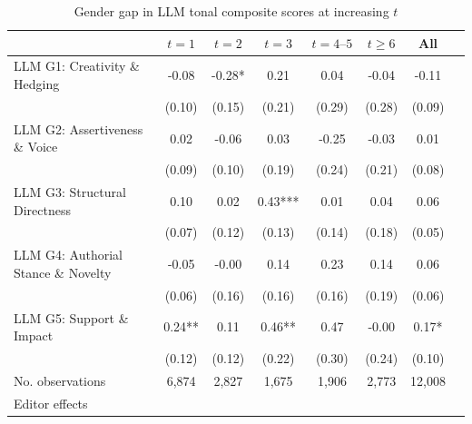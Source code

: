 \begin{table}
    \footnotesize
    \centering
    \begin{threeparttable}
        \caption{Gender gap in LLM tonal composite scores at increasing \(t\)}
        \label{tableH2llm_FemRatio}
        \begin{tabular}{p{3cm}S@{}S@{}S@{}S@{}S@{}S@{}S@{}}
            \toprule
            &{\(t=1\)}&{\(t=2\)}&{\(t=3\)}&{\(t=4\text{--}5\)}&{\(t\ge6\)}&{All}\\
            \midrule
            LLM G1: Creativity \& Hedging &       -0.08   &       -0.28*  &        0.21   &        0.04   &       -0.04   &       -0.11   \\
                                          &      (0.10)   &      (0.15)   &      (0.21)   &      (0.29)   &      (0.28)   &      (0.09)   \\
            LLM G2: Assertiveness \& Voice&        0.02   &       -0.06   &        0.03   &       -0.25   &       -0.03   &        0.01   \\
                                          &      (0.09)   &      (0.10)   &      (0.19)   &      (0.24)   &      (0.21)   &      (0.08)   \\
            LLM G3: Structural Directness &        0.10   &        0.02   &        0.43***&        0.01   &        0.04   &        0.06   \\
                                          &      (0.07)   &      (0.12)   &      (0.13)   &      (0.14)   &      (0.18)   &      (0.05)   \\
            LLM G4: Authorial Stance \& Novelty&       -0.05   &       -0.00   &        0.14   &        0.23   &        0.14   &        0.06   \\
                                          &      (0.06)   &      (0.16)   &      (0.16)   &      (0.16)   &      (0.19)   &      (0.06)   \\
            LLM G5: Support \& Impact     &        0.24** &        0.11   &        0.46** &        0.47   &       -0.00   &        0.17*  \\
                                          &      (0.12)   &      (0.12)   &      (0.22)   &      (0.30)   &      (0.24)   &      (0.10)   \\
            \midrule
            No. observations              &       6,874   &       2,827   &       1,675   &       1,906   &       2,773   &      12,008   \\
            \midrule
Editor effects        &           {}   &           {}   &           {}   &           {}   &           {}   &           {}   \\

\end{tabular}
\end{threeparttable}
\end{table}
